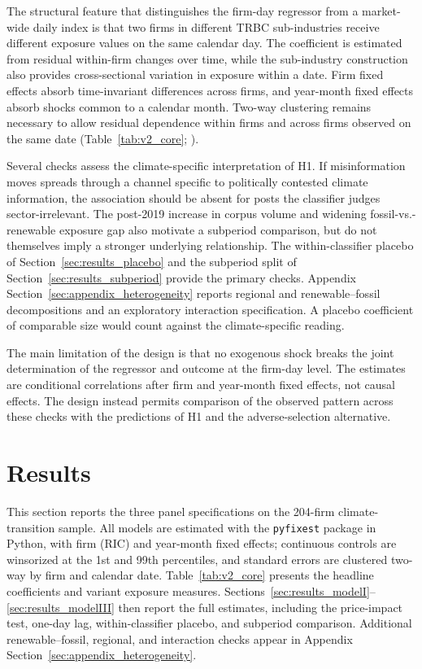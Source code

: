\documentclass{article}
\theoremstyle{plain}
\begin{document}
The structural feature that distinguishes the firm-day regressor from a market-wide daily index is that two firms in different TRBC sub-industries receive different exposure values on the same calendar day. The coefficient is estimated from residual within-firm changes over time, while the sub-industry construction also provides cross-sectional variation in exposure within a date. Firm fixed effects absorb time-invariant differences across firms, and year-month fixed effects absorb shocks common to a calendar month. Two-way clustering remains necessary to allow residual dependence within firms and across firms observed on the same date (Table~\ref{tab:v2_core}; \cite{Moulton1990}).

Several checks assess the climate-specific interpretation of H1. If misinformation moves spreads through a channel specific to politically contested climate information, the association should be absent for posts the classifier judges sector-irrelevant. The post-2019 increase in corpus volume and widening fossil-vs.-renewable exposure gap also motivate a subperiod comparison, but do not themselves imply a stronger underlying relationship. The within-classifier placebo of Section~\ref{sec:results_placebo} and the subperiod split of Section~\ref{sec:results_subperiod} provide the primary checks. Appendix Section~\ref{sec:appendix_heterogeneity} reports regional and renewable--fossil decompositions and an exploratory interaction specification. A placebo coefficient of comparable size would count against the climate-specific reading.

The main limitation of the design is that no exogenous shock breaks the joint determination of the regressor and outcome at the firm-day level. The estimates are conditional correlations after firm and year-month fixed effects, not causal effects. The design instead permits comparison of the observed pattern across these checks with the predictions of H1 and the adverse-selection alternative.

\section{Results}
\label{sec:results}

This section reports the three panel specifications on the 204-firm climate-transition sample. All models are estimated with the \texttt{pyfixest} package in Python, with firm (RIC) and year-month fixed effects; continuous controls are winsorized at the 1st and 99th percentiles, and standard errors are clustered two-way by firm and calendar date. Table~\ref{tab:v2_core} presents the headline coefficients and variant exposure measures. Sections~\ref{sec:results_modelI}--\ref{sec:results_modelIII} then report the full estimates, including the price-impact test, one-day lag, within-classifier placebo, and subperiod comparison. Additional renewable--fossil, regional, and interaction checks appear in Appendix Section~\ref{sec:appendix_heterogeneity}.
\end{document}
